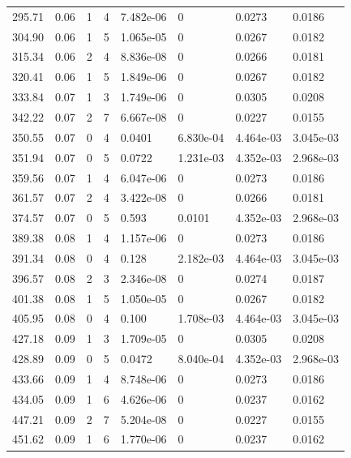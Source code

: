\documentclass[preview]{standalone}
\begin{document}
{{{\begin{tabular}{L{1.2cm}C{1.2cm} C{0.3cm}C{0.5cm} C{1.4cm}C{1.4cm} C{1.4cm}C{1.4cm}}
  295.71  &  0.06  & 1     &  4 &  7.482e-06  & 0  & 0.0273 &  0.0186   \\ 
  304.90  &  0.06  & 1     &  5 &  1.065e-05  & 0  & 0.0267 &  0.0182   \\ 
  315.34  &  0.06  & 2     &  4 &  8.836e-08  & 0  & 0.0266 &  0.0181   \\ 
  320.41  &  0.06  & 1     &  5 &  1.849e-06  & 0  & 0.0267 &  0.0182   \\ 
  333.84  &  0.07  & 1     &  3 &  1.749e-06  & 0  & 0.0305 &  0.0208   \\ 
  342.22  &  0.07  & 2     &  7 &  6.667e-08  & 0  & 0.0227 &  0.0155   \\ 
  350.55  &  0.07  & 0     &  4 &  0.0401  & 6.830e-04  & 4.464e-03 &  3.045e-03   \\ 
  351.94  &  0.07  & 0     &  5 &  0.0722  & 1.231e-03  & 4.352e-03 &  2.968e-03   \\ 
  359.56  &  0.07  & 1     &  4 &  6.047e-06  & 0  & 0.0273 &  0.0186   \\ 
  361.57  &  0.07  & 2     &  4 &  3.422e-08  & 0  & 0.0266 &  0.0181   \\ 
  374.57  &  0.07  & 0     &  5 &  0.593  & 0.0101  & 4.352e-03 &  2.968e-03   \\ 
  389.38  &  0.08  & 1     &  4 &  1.157e-06  & 0  & 0.0273 &  0.0186   \\ 
  391.34  &  0.08  & 0     &  4 &  0.128  & 2.182e-03  & 4.464e-03 &  3.045e-03   \\ 
  396.57  &  0.08  & 2     &  3 &  2.346e-08  & 0  & 0.0274 &  0.0187   \\ 
  401.38  &  0.08  & 1     &  5 &  1.050e-05  & 0  & 0.0267 &  0.0182   \\ 
  405.95  &  0.08  & 0     &  4 &  0.100  & 1.708e-03  & 4.464e-03 &  3.045e-03   \\ 
  427.18  &  0.09  & 1     &  3 &  1.709e-05  & 0  & 0.0305 &  0.0208   \\ 
  428.89  &  0.09  & 0     &  5 &  0.0472  & 8.040e-04  & 4.352e-03 &  2.968e-03   \\ 
  433.66  &  0.09  & 1     &  4 &  8.748e-06  & 0  & 0.0273 &  0.0186   \\ 
  434.05  &  0.09  & 1     &  6 &  4.626e-06  & 0  & 0.0237 &  0.0162   \\ 
  447.21  &  0.09  & 2     &  7 &  5.204e-08  & 0  & 0.0227 &  0.0155   \\ 
  451.62  &  0.09  & 1     &  6 &  1.770e-06  & 0  & 0.0237 &  0.0162   \\ 

\end{tabular}}}}
\end{document}
